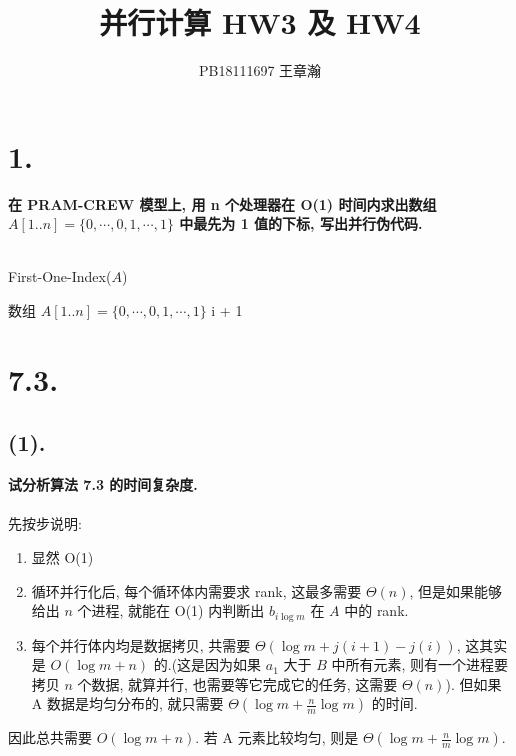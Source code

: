 \documentclass[UTF8]{article}
\title{并行计算 HW3 及 HW4}
\author{PB18111697 王章瀚}
\newcommand{\jumpLine} {\hspace*{\fill} \\}
\begin{document}
\maketitle
\section*{1.}
\noindent \textbf{在 PRAM-CREW 模型上, 用 n 个处理器在 O(1) 时间内求出数组 $A[1..n]=\{0,\cdots,0,1,\cdots,1\}$ 中最先为 1 值的下标, 写出并行伪代码.} \\ \jumpLine

\begin{algorithm}[H]
	\caption{{\sc First-One-Index}($A$)}
	\begin{algorithmic}[1] %
		\Require 数组 $A[1..n]=\{0,\cdots,0,1,\cdots,1\}$
					\State \Return i + 1
				\EndIf
			\EndFor
		\EndFunction
	\end{algorithmic}
\end{algorithm}

\section*{7.3.}
\subsection*{(1).}
\noindent \textbf{试分析算法 7.3 的时间复杂度.} \\ \jumpLine\noindent
先按步说明:
\begin{enumerate}[(1).]
	\item 显然 O(1)
	\item 循环并行化后, 每个循环体内需要求 rank, 这最多需要 $\Theta(n)$, 但是如果能够给出 $n$ 个进程, 就能在 O(1) 内判断出 $b_{i\log m}$ 在 $A$ 中的 rank.
	\item 每个并行体内均是数据拷贝, 共需要 $\Theta(\log m + j(i + 1) - j(i))$, 这其实是 $O(\log m + n)$ 的.(这是因为如果 $a_1$ 大于 $B$ 中所有元素, 则有一个进程要拷贝 $n$ 个数据, 就算并行, 也需要等它完成它的任务, 这需要 $\Theta(n)$). 但如果 A 数据是均匀分布的, 就只需要 $\Theta(\log m + \frac{n}{m}\log m)$ 的时间.
\end{enumerate}
因此总共需要 $O(\log m + n)$. 若 A 元素比较均匀, 则是 $\Theta(\log m + \frac{n}{m}\log m)$.
\end{document}
